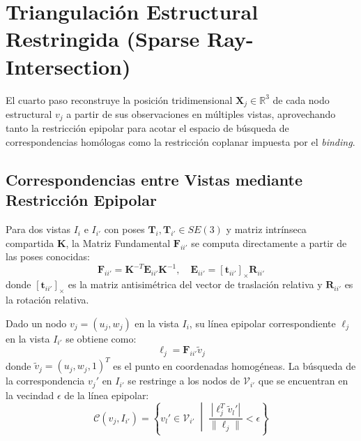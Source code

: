 \section{Triangulación Estructural Restringida (Sparse Ray-Intersection)}

El cuarto paso reconstruye la posición tridimensional $\mathbf{X}_j \in \mathbb{R}^3$ de cada nodo estructural $v_j$ a partir de sus observaciones en múltiples vistas, aprovechando tanto la restricción epipolar para acotar el espacio de búsqueda de correspondencias homólogas como la restricción coplanar impuesta por el \textit{binding}.
 
\subsection{Correspondencias entre Vistas mediante Restricción Epipolar}
 
Para dos vistas $I_i$ e $I_{i'}$ con poses $\mathbf{T}_i, \mathbf{T}_{i'} \in SE(3)$ y matriz intrínseca compartida $\mathbf{K}$, la Matriz Fundamental $\mathbf{F}_{ii'}$ se computa directamente a partir de las poses conocidas:
\begin{equation}
    \mathbf{F}_{ii'} = \mathbf{K}^{-T} \mathbf{E}_{ii'} \mathbf{K}^{-1}, \quad \mathbf{E}_{ii'} = [\mathbf{t}_{ii'}]_\times \mathbf{R}_{ii'}
\end{equation}
donde $[\mathbf{t}_{ii'}]_\times$ es la matriz antisimétrica del vector de traslación relativa y $\mathbf{R}_{ii'}$ es la rotación relativa.
 
Dado un nodo $v_j = (u_j, w_j)$ en la vista $I_i$, su línea epipolar correspondiente $\ell_j$ en la vista $I_{i'}$ se obtiene como:
\begin{equation}
    \ell_j = \mathbf{F}_{ii'} \tilde{v}_j
\end{equation}
donde $\tilde{v}_j = (u_j, w_j, 1)^T$ es el punto en coordenadas homogéneas. La búsqueda de la correspondencia $v_j'$ en $I_{i'}$ se restringe a los nodos de $\mathcal{V}_{i'}$ que se encuentran en la vecindad $\epsilon$ de la línea epipolar:
\begin{equation}
    \mathcal{C}(v_j, I_{i'}) = \left\{ v_l' \in \mathcal{V}_{i'} \;\middle|\; \frac{|\ell_j^T \tilde{v}_l'|}{\|\ell_j\|} < \epsilon \right\}
\end{equation}
 
